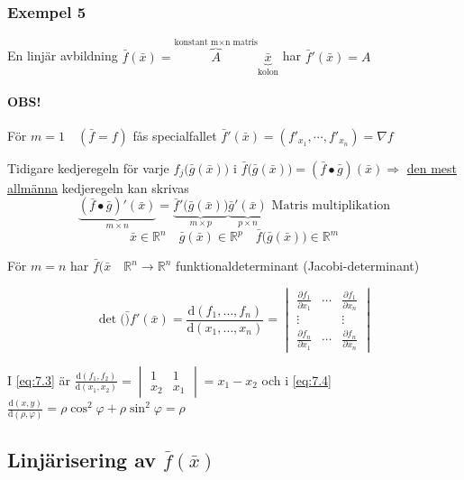 \documentclass[a4paper]{article}
\let\olddet\det
\renewcommand*{\det}[1]{\olddet(#1)}
\begin{document}
\subsubsection{Exempel 5}
En linjär avbildning \(\bar{f}(\bar{x}) = \overbrace{A}^{\text{konstant m}\times\text{n matris}}\underbrace{\bar{x}}_{\text{kolon}}\) har \(\bar{f}'(\bar{x}) = A\)
\newline

\paragraph{OBS!} För \(m=1 \quad (\bar{f} = f)\) fås specialfallet \(\bar{f}'(\bar{x}) = (f'_{x_1}, \cdots ,f'_{x_n}) = \nabla f\) \newline

Tidigare kedjeregeln för varje \(f_j\big(\bar{g}(\bar{x})\big)\) i \(\bar{f}\big(\bar{g}(\bar{x})\big) = (\bar{f} \bullet \bar{g})(\bar{x}) \Rightarrow\) \underline{den mest allmänna} kedjeregeln kan skrivas
\[
	\underbrace{(\bar{f} \bullet \bar{g})'(\bar{x})}_{m \times n} = \underbrace{\bar{f}'\big(\bar{g}(\bar{x})\big)}_{m \times p}\underbrace{\bar{g}'(\bar{x})}_{p \times n} \text{ Matris multiplikation}
\]
\[
	\bar{x} \in \mathbb{R}^n \quad \bar{g}(\bar{x}) \in \mathbb{R}^p \quad \bar{f}\big(\bar{g}(\bar{x})\big) \in \mathbb{R}^m
\]

För \underline{\(m=n\)} har \(\bar{f}(\bar{x} \quad \mathbb{R}^n \rightarrow \mathbb{R}^n\) funktionaldeterminant (Jacobi-determinant)

\[
	\det\bar{f}'(\bar{x}) = \frac{\mathrm{d}(f_1, \ldots ,f_n)}{\mathrm{d}(x_1, \ldots ,x_n)} =
	\begin{vmatrix}
		\frac{\partial f_1}{\partial x_1} & \cdots & \frac{\partial f_1}{\partial x_n} \\
		\vdots & & \vdots \\
		\frac{\partial f_n}{\partial x_1} & \cdots & \frac{\partial f_n}{\partial x_n}
	\end{vmatrix}
\]

I \eqref{eq:7.3} är \(\frac{\mathrm{d}(f_1,f_2)}{\mathrm{d}(x_1,x_2)} =
\begin{vmatrix}
	1 & 1 \\
	x_2 & x_1
\end{vmatrix}
= x_1-x_2\) och i \eqref{eq:7.4} \(\frac{\mathrm{d}(x,y)}{\mathrm{d}(\rho,\varphi)} = \rho\cos^2{\varphi} + \rho\sin^2{\varphi} = \rho\) \label{Rho}

\subsection{Linjärisering av \texorpdfstring{\(\bar{f}(\bar{x})\)}{f(x)}}
\end{document}
